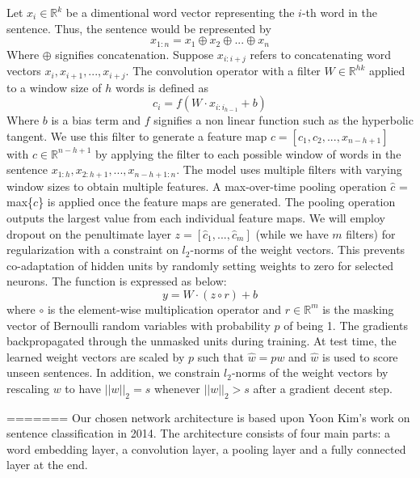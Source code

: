 \documentclass[conference]{IEEEtran}
\begin{document}
 Let $x_{i} \in \mathbb{R}^k$ be a dimentional word vector representing the $i$-th word in the 
 sentence. Thus, the sentence would be represented by 
 \begin{equation}
 x_{1:n} = x_1 \oplus x_2 \oplus ... \oplus x_n
 \end{equation}
 Where $\oplus$ signifies concatenation. Suppose $x_{i:i+j}$ refers to concatenating 
 word vectors $x_i, x_{i+1}, ... , x_{i+j}$. The convolution operator with a filter $W \in \mathbb{R}^{hk}$ applied to a window size of $h$ 
 words is defined as 
 \begin{equation}
 c_i = f(W \cdot x_{i:i_{h-1}} + b)
 \end{equation}
 Where $b$ is a bias term and $f$ signifies a non linear function such as the hyperbolic tangent. We use this
 filter to generate a feature map $c = [c_1, c_2, ... ,x_{n-h+1}]$ with $c \in \mathbb{R}^{n-h+1}$ by applying the filter to each possible window of words in the sentence $x_{1:h}, x_{2:h+1}, ... ,x_{n-h+1:n}$. 
 The model uses multiple filters with varying window sizes to obtain multiple features. 
 A max-over-time pooling operation $\hat{c}$ = max\{$c$\} is applied once the feature maps are generated. 
 The pooling operation outputs the largest value from each individual feature maps. 
 We will employ dropout on the penultimate layer $z = [\hat{c}_1,...,\hat{c}_m]$ (while we have $m$ filters) for regularization with a constraint on $l_2$-norms of the weight vectors. This prevents co-adaptation of hidden units by randomly setting weights to zero for selected neurons.  The function is expressed as below: 
 \begin{equation}
 y = W \cdot (z \circ r) + b
 \end{equation}
where $\circ$ is the element-wise multiplication operator and $r \in \mathbb{R}^m$ is the masking vector of Bernoulli random variables 
with probability $p$ of being 1. The gradients backpropagated through the unmasked units during training. At test time, the learned weight vectors are scaled by $p$ such that $\hat{w} = pw$ and $\hat{w}$ is used to score unseen sentences. 
In addition, we constrain $l_2$-norms of the weight vectors by rescaling $w$ to have $||w||_2 = s$ whenever $||w||_2 > s$ after a gradient decent step. 

=======
     Our chosen network architecture is based upon Yoon Kim's work on sentence
     classification in 2014. The architecture consists of four main parts: a word
     embedding layer, a convolution layer, a pooling layer and a fully connected layer
     at the end.
     
\end{document}
